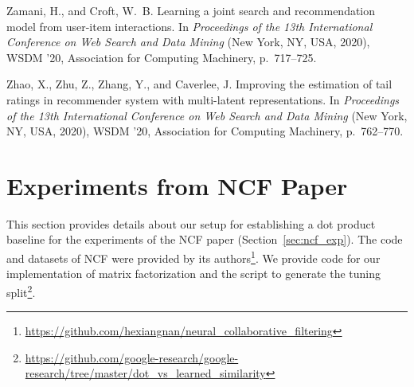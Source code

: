 \documentclass{article}
\begin{document}
\begin{thebibliography}{10}
{\sc Zamani, H., and Croft, W.~B.}
\newblock Learning a joint search and recommendation model from user-item
  interactions.
\newblock In {\em Proceedings of the 13th International Conference on Web
  Search and Data Mining\/} (New York, NY, USA, 2020), WSDM ’20, Association
  for Computing Machinery, p.~717–725.

{\sc Zhao, X., Zhu, Z., Zhang, Y., and Caverlee, J.}
\newblock Improving the estimation of tail ratings in recommender system with
  multi-latent representations.
\newblock In {\em Proceedings of the 13th International Conference on Web
  Search and Data Mining\/} (New York, NY, USA, 2020), WSDM ’20, Association
  for Computing Machinery, p.~762–770.

\end{thebibliography}
 
\appendix

\section{Experiments from NCF Paper}
\label{sec:ncf_exp_details}

This section provides details about our setup for establishing a dot product baseline for the experiments of the NCF paper (Section~\ref{sec:ncf_exp}).
The code and datasets of NCF were provided by its authors\footnote{\url{https://github.com/hexiangnan/neural_collaborative_filtering}}.
We provide code for our implementation of matrix factorization and the script to generate the tuning split\footnote{\url{https://github.com/google-research/google-research/tree/master/dot_vs_learned_similarity}}.
\end{document}
